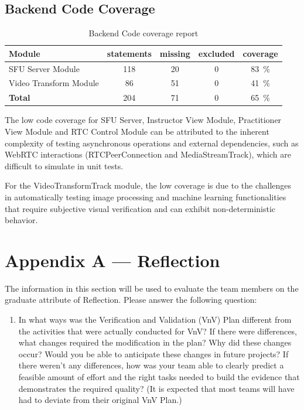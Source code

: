 \documentclass[12pt, titlepage]{article}
\begin{document}
\subsection*{Backend Code Coverage}

\begin{table}[htbp]
  \centering
  \begin{tabular}{@{}lcccc@{}}
    \toprule
    \textbf{Module}              & \textbf{statements} & \textbf{missing} & \textbf{excluded} & \textbf{coverage}       \\ \midrule
    SFU Server Module      & 118           & 20         & 0           & \SI{83}{\percent} \\
    Video Transform Module & 86            & 51         & 0           & \SI{41}{\percent} \\ \midrule
    \textbf{Total}               & 204           & 71         & 0           & \SI{65}{\percent} \\ \bottomrule
  \end{tabular}
  \caption{Backend Code coverage report}
  \label{tab:backend-cov}
\end{table}

The low code coverage for SFU Server, Instructor View Module, Practitioner View
Module and RTC Control Module can be attributed to the inherent complexity of
testing asynchronous operations and external dependencies, such as WebRTC
interactions (RTCPeerConnection and MediaStreamTrack), which are difficult to
simulate in unit tests.

For the VideoTransformTrack module, the low coverage is due to the challenges in
automatically testing image processing and machine learning functionalities that
require subjective visual verification and can exhibit non-deterministic
behavior.

\newpage{}
\section*{Appendix A --- Reflection}

The information in this section will be used to evaluate the team members on the
graduate attribute of Reflection.  Please answer the following question:

\begin{enumerate}
  \item In what ways was the Verification and Validation (VnV) Plan different
  from the activities that were actually conducted for VnV?  If there were
  differences, what changes required the modification in the plan?  Why did
  these changes occur?  Would you be able to anticipate these changes in future
  projects?  If there weren't any differences, how was your team able to clearly
  predict a feasible amount of effort and the right tasks needed to build the
  evidence that demonstrates the required quality?  (It is expected that most
  teams will have had to deviate from their original VnV Plan.)
\end{enumerate}
\end{document}
